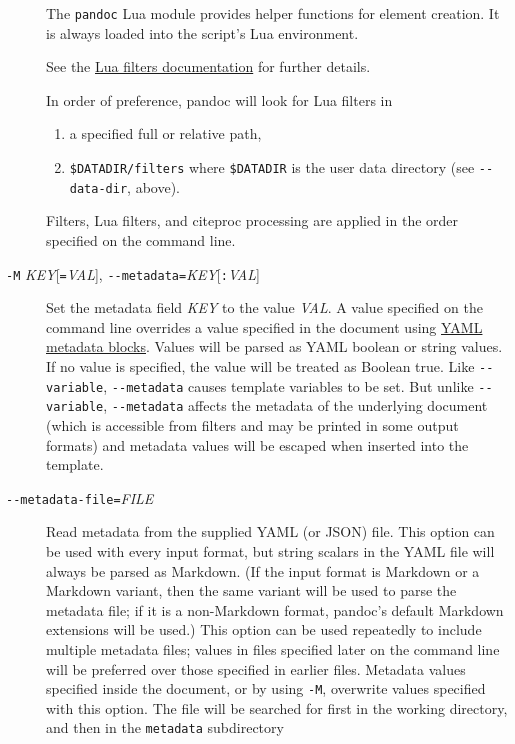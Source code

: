 \begin{description}
The \texttt{pandoc} Lua module provides helper functions for element
creation. It is always loaded into the script's Lua environment.

See the \href{https://pandoc.org/lua-filters.html}{Lua filters
documentation} for further details.

In order of preference, pandoc will look for Lua filters in

\begin{enumerate}
\def\labelenumi{\arabic{enumi}.}
\item
  a specified full or relative path,
\item
  \texttt{\$DATADIR/filters} where \texttt{\$DATADIR} is the user data
  directory (see \texttt{-\/-data-dir}, above).
\end{enumerate}

Filters, Lua filters, and citeproc processing are applied in the order
specified on the command line.
\item[\texttt{-M} \emph{KEY}{[}\texttt{=}\emph{VAL}{]},
\texttt{-\/-metadata=}\emph{KEY}{[}\texttt{:}\emph{VAL}{]}]
Set the metadata field \emph{KEY} to the value \emph{VAL}. A value
specified on the command line overrides a value specified in the
document using \protect\hyperlink{extension-yaml_metadata_block}{YAML
metadata blocks}. Values will be parsed as YAML boolean or string
values. If no value is specified, the value will be treated as Boolean
true. Like \texttt{-\/-variable}, \texttt{-\/-metadata} causes template
variables to be set. But unlike \texttt{-\/-variable},
\texttt{-\/-metadata} affects the metadata of the underlying document
(which is accessible from filters and may be printed in some output
formats) and metadata values will be escaped when inserted into the
template.
\item[\texttt{-\/-metadata-file=}\emph{FILE}]
Read metadata from the supplied YAML (or JSON) file. This option can be
used with every input format, but string scalars in the YAML file will
always be parsed as Markdown. (If the input format is Markdown or a
Markdown variant, then the same variant will be used to parse the
metadata file; if it is a non-Markdown format, pandoc's default Markdown
extensions will be used.) This option can be used repeatedly to include
multiple metadata files; values in files specified later on the command
line will be preferred over those specified in earlier files. Metadata
values specified inside the document, or by using \texttt{-M}, overwrite
values specified with this option. The file will be searched for first
in the working directory, and then in the \texttt{metadata} subdirectory

\end{description}
